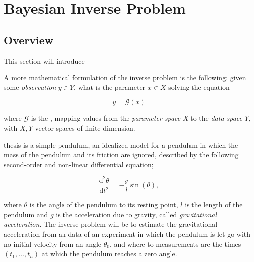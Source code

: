 \section{Bayesian Inverse Problem}
\subsection{Overview}

This section will introduce 




A more mathematical formulation of the inverse problem is the following: given some \textit{observation} $y \in Y$, what is the parameter $x \in X$ solving the equation

\begin{equation}
  y = \mathcal{G}(x)
\end{equation}

where $\mathcal{G}$ is the \textit{}, mapping values from the \textit{parameter space} $X$ to the \textit{data space} $Y$, with $X,Y$ vector spaces of finite dimension.





thesis is a simple pendulum, an idealized model for a pendulum in which the mass of the pendulum and its friction are ignored, described by the following second-order and non-linear differential equation;

\begin{equation} \label{pendulum-diff-eq}
  \frac{\text{d}^2\theta}{\text{d}t^2} = -\frac{g}{l}\sin(\theta),
\end{equation}

where $\theta$ is the angle of the pendulum to its resting point, $l$ is the length of the pendulum and $g$ is the acceleration due to gravity, called \textit{gravitational acceleration}. The inverse problem will be to estimate the gravitational acceleration from an data of an experiment in which the pendulum is let go with no initial velocity from an angle $\theta_0$, and where to measurements are the times $(t_1, \ldots, t_n)$ at which the pendulum reaches a zero angle.

